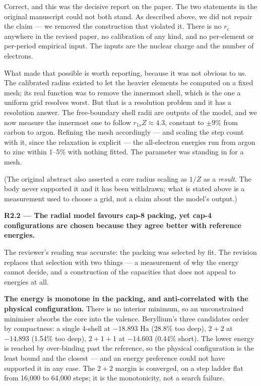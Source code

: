 \documentclass[11pt,a4paper]{article}
\begin{document}
Correct, and this was the decisive report on the paper. The two statements in the original
manuscript could not both stand. As described above, we did not repair the claim --- we removed
the construction that violated it. There is no $r_c$ anywhere in the revised paper, no
calibration of any kind, and no per-element or per-period empirical input. The inputs are the
nuclear charge and the number of electrons.

What made that possible is worth reporting, because it was not obvious to us. The calibrated
radius existed to let the heavier elements be computed on a fixed mesh; its real function was
to remove the innermost shell, which is the one a uniform grid resolves worst. But that is a
resolution problem and it has a resolution answer. The free-boundary shell radii are outputs of
the model, and we now measure the innermost one to follow $r_{1s}Z \approx 4.3$, constant to
$\pm9\%$ from carbon to argon. Refining the mesh accordingly --- and scaling the step count with
it, since the relaxation is explicit --- the all-electron energies run from argon to zinc within
1--5\% with nothing fitted. The parameter was standing in for a mesh.

(The original abstract also asserted a core radius scaling as $1/Z$ as a \emph{result}. The body
never supported it and it has been withdrawn; what is stated above is a measurement used to
choose a grid, not a claim about the model's output.)

\textbf{R2.2 --- The radial model favours cap-8 packing, yet cap-4 configurations are chosen because
they agree better with reference energies.}

The reviewer's reading was accurate: the packing was selected by fit. The revision replaces that
selection with two things --- a measurement of why the energy cannot decide, and a construction of the
capacities that does not appeal to energies at all.

\textbf{The energy is monotone in the packing, and anti-correlated with the physical configuration.} There
is no interior minimum, so an unconstrained minimiser absorbs the core into the valence. Beryllium's
three candidates order by compactness: a single 4-shell at $-18.893$ Ha (28.8\% too deep), $2{+}2$ at
$-14.893$ (1.54\% too deep), $2{+}1{+}1$ at $-14.603$ (0.44\% short). The lower energy is reached by
over-binding past the reference, so the physical configuration is the least bound and the closest ---
and an energy preference could not have supported it in any case. The $2{+}2$ margin is converged, on
a step ladder flat from 16,000 to 64,000 steps; it is the monotonicity, not a search failure.
\end{document}

